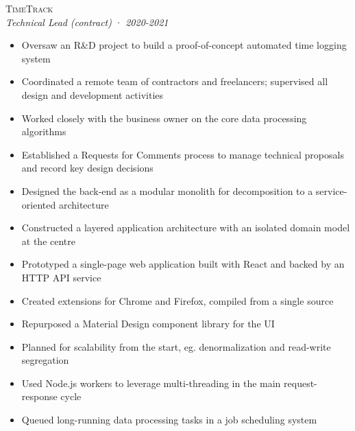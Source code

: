 \documentclass[a4paper,10pt]{article}
\newcommand{\resumeSubheading}[5][12pt]{
  \vspace{#1}
  {\scshape{#2}} \\
  \textit{\small{#3}} \textit{\small{(#4)}} · \textit{\small{#5}}
  \vspace{2pt}
}
\newcommand{\resumeListStart}{\begin{itemize}}
\newcommand{\resumeListEnd}{\end{itemize}}
\newcommand{\resumeItem}[1]{
  \item[\-·]\small{{#1\vspace{1pt}}}
}
\begin{document}
  \begin{minipage}{\textwidth}
    \resumeSubheading
      {TimeTrack}
      {Technical Lead}
      {contract}
      {2020-2021}
    \resumeListStart
      \resumeItem{Oversaw an R\&D project to build a proof-of-concept automated time logging system}
      \resumeItem{Coordinated a remote team of contractors and freelancers; supervised all design and development activities}
      \resumeItem{Worked closely with the business owner on the core data processing algorithms}
      \resumeItem{Established a Requests for Comments process to manage technical proposals and record key design decisions}
      \resumeItem{Designed the back-end as a modular monolith for decomposition to a service-oriented architecture}
      \resumeItem{Constructed a layered application architecture with an isolated domain model at the centre}
      \resumeItem{Prototyped a single-page web application built with React and backed by an HTTP API service}
      \resumeItem{Created extensions for Chrome and Firefox, compiled from a single source}
      \resumeItem{Repurposed a Material Design component library for the UI}
      \resumeItem{Planned for scalability from the start, eg. denormalization and read-write segregation}
      \resumeItem{Used Node.js workers to leverage multi-threading in the main request-response cycle}
      \resumeItem{Queued long-running data processing tasks in a job scheduling system}
    \resumeListEnd
  \end{minipage}


\end{document}
